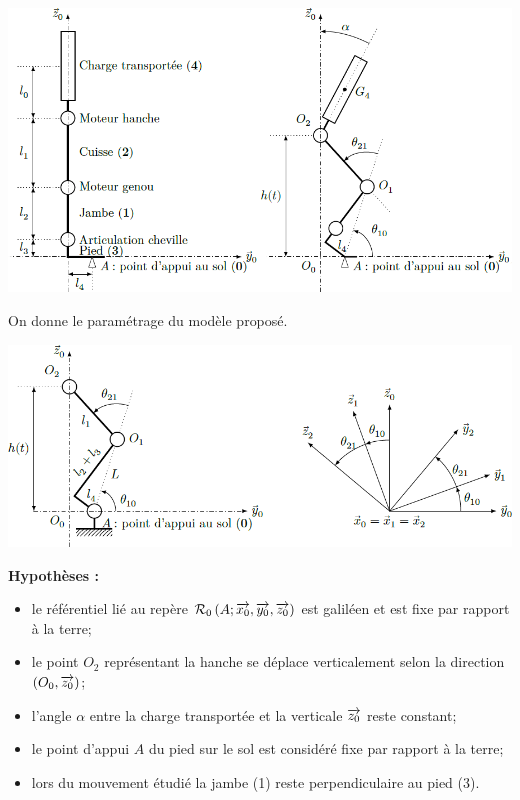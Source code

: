 \documentclass[10pt,fleqn]{article} %
\begin{document}
\begin{multicols}{2}
\begin{center}
\includegraphics[width=\linewidth]{images/fig_03}
\end{center}




On donne le paramétrage du modèle proposé. 

\begin{center}
\includegraphics[width=\linewidth]{images/fig_04}
\end{center}

\textbf{Hypothèses : }
\begin{itemize}
\item le référentiel lié au repère $\mathcal{R}_0\left(A;\overrightarrow{x_0},\overrightarrow{y_0},\overrightarrow{z_0} \right)$ est galiléen et est fixe par rapport à la terre;
\item le point $O_2$ représentant la hanche se déplace verticalement selon la direction $\left(O_0,\overrightarrow{z_0}\right)$;
\item l’angle $\alpha$ entre la charge transportée et la verticale $\overrightarrow{z_0}$ reste constant;
\item le point d’appui $A$ du pied sur le sol est considéré fixe par rapport à la terre;
\item lors du mouvement étudié la jambe (1) reste perpendiculaire au pied (3).
\end{itemize}


\end{multicols}
\end{document}
